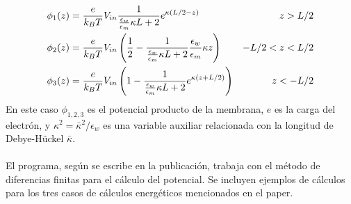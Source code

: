 \documentclass[12pt, notitlepage]{article}
\begin{document}
\begin{align}
\phi_1(z) &= \frac{e}{k_BT}V_{in}\frac{1}{\frac{\epsilon_w}{\epsilon_m}\kappa L + 2}e^{\kappa(L/2 - z)} &z>L/2\\
\phi_2(z) &= \frac{e}{k_BT}V_{in}\left(\frac{1}{2}-\frac{1}{\frac{\epsilon_w}{\epsilon_m}\kappa L + 2}\frac{\epsilon_w}{\epsilon_m}\kappa z\right) &-L/2 < z < L/2\\
\arraycolsep=0.3in\def\arraystretch{2}
\phi_3(z) &= \frac{e}{k_BT}V_{in}\left(1 - \frac{1}{\frac{\epsilon_w}{\epsilon_m}\kappa L + 2}e^{\kappa(z+ L/2)}\right)&z<-L/2
\end{align}
En este caso $\phi_{1,2,3}$ es el potencial producto de la membrana, $e$ es la carga del electrón, y $\kappa^2=\bar{\kappa}^2/\epsilon_w$ es una variable auxiliar relacionada con la longitud de Debye-Hückel $\bar{\kappa}$.\\\\
El programa, según se escribe en la publicación, trabaja con el método de diferencias finitas para el cálculo del potencial. Se incluyen ejemplos de cálculos para los tres casos de cálculos energéticos mencionados en el paper.
\end{document}
